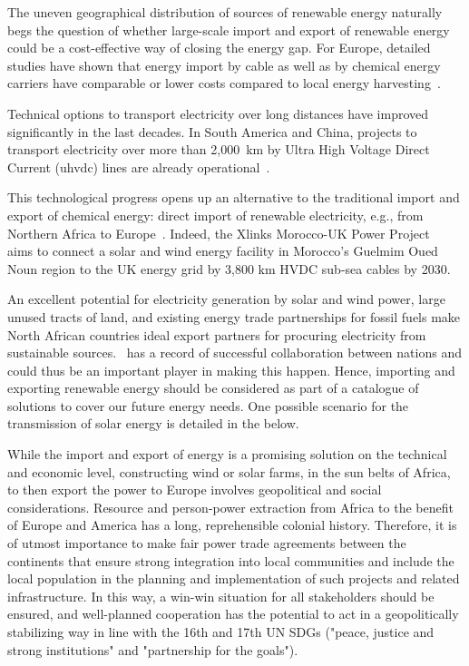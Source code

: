 \documentclass[../SustainableHEP.tex]{subfiles}
\begin{document}
The uneven geographical distribution of sources of renewable energy naturally begs the question of whether large-scale import and export of renewable energy could be a cost-effective way of closing the energy gap. For Europe, detailed studies have shown that energy import by cable as well as by chemical energy carriers have comparable or lower costs compared to local energy harvesting~\cite{10.1371/journal.pone.0281380}.

Technical options to transport electricity over long distances have improved significantly in the last decades. In South America and China, projects to transport electricity over more than 2,000~km by Ultra High Voltage Direct Current (\acrshort{uhvdc}) lines are already operational~\cite{Champion}.

This technological progress opens up an alternative to the traditional import and export of chemical energy: direct import of renewable electricity, e.g., from Northern Africa to Europe~\cite{Dueren,Dueren+2011+263+275}. Indeed, the Xlinks Morocco-UK Power Project~\cite{Xlinks} aims to connect a solar and wind energy facility in Morocco's Guelmim Oued Noun region to the UK energy grid by 3,800 km HVDC sub-sea cables by 2030.

An excellent potential for electricity generation by solar and wind power, large unused tracts of land, and existing energy trade partnerships for fossil fuels make North African countries ideal export partners for procuring electricity from sustainable sources.  \ACR\ has a record of successful collaboration between nations and could thus be an important player in making this happen.  Hence, importing and exporting renewable energy should be considered as part of a catalogue of solutions to cover our future energy needs.  One possible scenario for the transmission of solar energy is detailed in the  below. 

While the import and export of energy is a promising solution on the technical and economic level, constructing wind or solar farms, \eg in the sun belts of Africa, to then export the power to Europe involves geopolitical and social considerations. Resource and person-power extraction from Africa to the benefit of Europe and America has a long, reprehensible colonial history. Therefore, it is of utmost importance to make fair power trade agreements between the continents that ensure strong integration into local communities and include the local population in the planning and implementation of such projects and related infrastructure. In this way, a win-win situation for all stakeholders should be ensured, and well-planned cooperation has the potential to act in a geopolitically stabilizing way in line with the 16th and 17th UN SDGs ("peace, justice and strong institutions" and "partnership for the goals"). 
\end{document}
